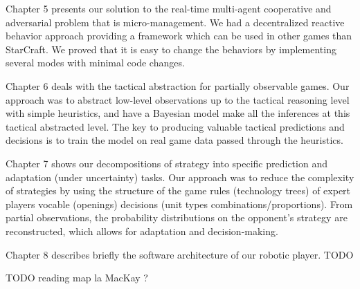 Chapter 5 presents our solution to the real-time multi-agent cooperative and adversarial problem that is micro-management. We had a decentralized reactive behavior approach providing a framework which can be used in other games than StarCraft. We proved that it is easy to change the behaviors by implementing several modes with minimal code changes.

Chapter 6 deals with the tactical abstraction for partially observable games. Our approach was to abstract low-level observations up to the tactical reasoning level with simple heuristics, and have a Bayesian model make all the inferences at this tactical abstracted level. The key to producing valuable tactical predictions and decisions is to train the model on real game data passed through the heuristics.

Chapter 7 shows our decompositions of strategy into specific prediction and adaptation (under uncertainty) tasks. Our approach was to reduce the complexity of strategies by using the structure of the game rules (technology trees) of expert players vocable (openings) decisions (unit types combinations/proportions). From partial observations, the probability distributions on the opponent's strategy are reconstructed, which allows for adaptation and decision-making.

Chapter 8 describes briefly the software architecture of our robotic player. TODO


TODO reading map la MacKay ?


